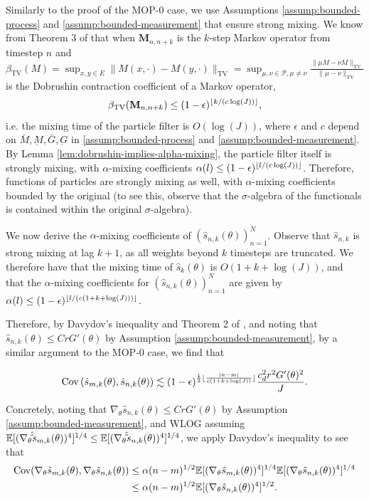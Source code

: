 \documentclass{article}
\begin{document}
Similarly to the proof of the MOP-$0$ case, we use Assumptions \ref{assump:bounded-process} and \ref{assump:bounded-measurement} that ensure strong mixing. We know from Theorem 3 of \cite{karjalainen2023} that when $\textbf{M}_{n,n+k}$ is the $k$-step Markov operator from timestep $n$ and $\beta_{\text{TV}}(M) = \sup _{x, y \in E}\|M(x, \cdot)-M(y, \cdot)\|_{\mathrm{TV}}=\sup _{\mu, \nu \in \mathcal{P}, \mu \neq \nu} \frac{\|\mu M-\nu M\|_{\mathrm{TV}}}{\|\mu-\nu\|_{\mathrm{TV}}}$ is the Dobrushin contraction coefficient of a Markov operator, 
$$\beta_{\text{TV}}(\textbf{M}_{n,n+k}) \leq (1-\epsilon)^{\lfloor k/(c\log(J)) \rfloor},$$
i.e. the mixing time of the particle filter is $O(\log(J))$, where $\epsilon$ and $c$ depend on $\bar{M}, \underbar{M}, \bar{G}, \underbar{G}$ in \ref{assump:bounded-process} and \ref{assump:bounded-measurement}. By Lemma \ref{lem:dobrushin-implies-alpha-mixing}, the particle filter itself is strongly mixing, with $\alpha$-mixing coefficients $\alpha(l) \leq (1-\epsilon)^{\lfloor l/(c\log(J)) \rfloor}$. Therefore, functions of particles are strongly mixing as well, with $\alpha$-mixing coefficients bounded by the original (to see this, observe that the $\sigma$-algebra of the functionals is contained within the original $\sigma$-algebra).

We now derive the $\alpha$-mixing coefficients of $(\hat s_{n,k}(\theta))_{n=1}^N$. Observe that $\hat s_{n,k}$ is strong mixing at lag $k+1$, as all weights beyond $k$ timesteps are truncated. We therefore have that the mixing time of $\hat s_k(\theta)$ is $O(1+k+\log(J))$, and that the $\alpha$-mixing coefficients for $(\hat s_{n,k}(\theta))_{n=1}^N$ are given by $\alpha(l) \leq (1-\epsilon)^{\lfloor l/(c(1+k+\log(J))) \rfloor}$.

Therefore, by Davydov's inequality and Theorem 2 of \cite{delMoral03}, and noting that $\hat s_{n,k}(\theta) \leq CrG'(\theta)$ by Assumption \ref{assump:bounded-measurement}, by a similar argument to the MOP-0 case, we find that 

$$\text{Cov}\left(\hat s_{m,k}(\theta), \hat s_{n,k}(\theta)\right) \lesssim (1-\epsilon)^{\frac{1}{2}\lfloor \frac{|n-m|}{c(1+k+\log(J))} \rfloor}\frac{c_d^2r^2G'(\theta)^2}{J}.$$

Concretely, noting that $\nabla_\theta\hat s_{n,k}(\theta)\leq CrG'(\theta)$ by Assumption \ref{assump:bounded-measurement}, and WLOG assuming $\mathbb{E}[(\nabla_\theta\hat\hat s_{m,k}(\theta))^4]^{1/4}\leq\mathbb{E}[(\nabla_\theta\hat\hat s_{n,k}(\theta))^4]^{1/4}$, we apply Davydov's inequality to see that
\begin{align*}
    \text{Cov}(\nabla_\theta\hat s_{m,k}(\theta), \nabla_\theta\hat s_{n,k}(\theta)) 
    &\leq \alpha(n-m)^{1/2}\mathbb{E}[(\nabla_\theta\hat s_{m,k}(\theta))^4]^{1/4}\mathbb{E}[(\nabla_\theta\hat s_{n,k}(\theta))^4]^{1/4}\\
    &\leq \alpha(n-m)^{1/2}\mathbb{E}[(\nabla_\theta\hat s_{n,k}(\theta))^4]^{1/2}.
\end{align*}
\end{document}
